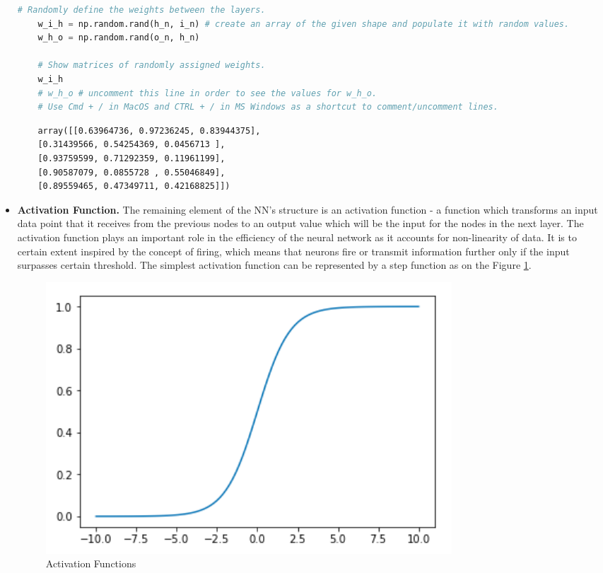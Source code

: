 \begin{itemize}
\begin{lstlisting}[language=Python]
    # Randomly define the weights between the layers. 
    w_i_h = np.random.rand(h_n, i_n) # create an array of the given shape and populate it with random values.
    w_h_o = np.random.rand(o_n, h_n) 
    
    # Show matrices of randomly assigned weights.
    w_i_h
    # w_h_o # uncomment this line in order to see the values for w_h_o.
    # Use Cmd + / in MacOS and CTRL + / in MS Windows as a shortcut to comment/uncomment lines.
\end{lstlisting}

\begin{lstlisting}
    array([[0.63964736, 0.97236245, 0.83944375],
    [0.31439566, 0.54254369, 0.0456713 ],
    [0.93759599, 0.71292359, 0.11961199],
    [0.90587079, 0.0855728 , 0.55046849],
    [0.89559465, 0.47349711, 0.42168825]])
\end{lstlisting}

\item \textbf{Activation Function.} The remaining element of the NN's structure is an activation function - a function which transforms an input data point that it receives from the previous nodes to an output value which will be the input for the nodes in the next layer. The activation function plays an important role in the efficiency of the neural network as it accounts for non-linearity of data. 
It is to certain extent inspired by the concept of firing, which means that neurons fire or transmit information further only if the input surpasses certain threshold. The simplest activation function can be represented by a step function as on the Figure \ref{fig:act-fct}. 

\begin{figure}[H]
    \includegraphics[width=\linewidth]{pics/sigmoid.png}
    \caption{\label{fig:act-fct} Activation Functions}
\end{figure}


\end{itemize}
